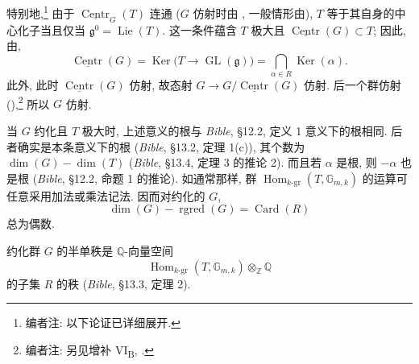 特别地,\footnote{编者注: 以下论证已详细展开.}
由于 \(\underline{\operatorname{Centr}}_{G}(T)\) 连通 (\(G\) 仿射时由 , 一般情形由), \(T\) 等于其自身的中心化子当且仅当 \(\mathfrak g^{0}=\operatorname{Lie}(T)\). 这一条件蕴含 \(T\) 极大且 \(\underline{\operatorname{Centr}}(G)\subset T\); 因此, 由,
\begin{equation}
  \underline{\operatorname{Centr}}(G)
  =
  \operatorname{Ker}\bigl(T\longrightarrow
    \operatorname{GL}(\mathfrak g)\bigr)
  =
  \bigcap_{\alpha\in R}\operatorname{Ker}(\alpha).
  \tag{1.10.3}
\end{equation}
此外, 此时 \(\underline{\operatorname{Centr}}(G)\) 仿射, 故态射
\(G\longrightarrow G/\underline{\operatorname{Centr}}(G)\) 仿射. 后一个群仿射 (),\footnote{编者注: 另见增补 VI\textsubscript{B}, .}
所以 \(G\) 仿射.

当 \(G\) 约化且 \(T\) 极大时, 上述意义的根与 \emph{Bible}, §12.2, 定义 1 意义下的根相同. 后者确实是本条意义下的根 (\emph{Bible}, §13.2, 定理 1(c)), 其个数为 \(\dim(G)-\dim(T)\) (\emph{Bible}, §13.4, 定理 3 的推论 2). 而且若 \(\alpha\) 是根, 则 \(-\alpha\) 也是根 (\emph{Bible}, §12.2, 命题 1 的推论). 如通常那样, 群
\(\operatorname{Hom}_{k\text{-}\mathrm{gr}}(T,\mathbb G_{m,k})\)
的运算可任意采用加法或乘法记法. 因而对约化的 \(G\),
\begin{equation}
  \dim(G)-\operatorname{rgred}(G)=\operatorname{Card}(R)
  \tag{1.10.4}
\end{equation}
总为偶数.

约化群 \(G\) 的半单秩是 \(\mathbb Q\)-向量空间
\[
  \operatorname{Hom}_{k\text{-}\mathrm{gr}}
    (T,\mathbb G_{m,k})\otimes_{\mathbb Z}\mathbb Q
\]
的子集 \(R\) 的秩 (\emph{Bible}, §13.3, 定理 2).

